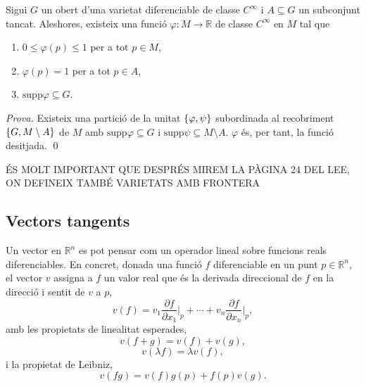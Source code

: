 \begin{corol}
    Sigui $G$ un obert d'una varietat diferenciable de classe $C^\infty$ i $A\subseteq G$ un subconjunt tancat. Aleshores, existeix una funció $\varphi:M\to\mathbb R$ de classe $C^\infty$ en $M$ tal que
    \begin{enumerate}
        \item $0\leq\varphi(p)\leq 1$ per a tot $p\in M$,
        \item $\varphi(p) = 1$ per a tot $p\in A$,
        \item $\text{supp}\varphi\subseteq G$.
    \end{enumerate}
\end{corol}
{
\color{green!50!black} \textit{Prova.} 
Existeix una partició de la unitat $\{\varphi, \psi\}$ subordinada al recobriment $\{G, M\setminus A\}$ de $M$ amb $\text{supp}\varphi\subseteq G$ i $\text{supp}\psi\subseteq M\setminus A$. $\varphi$ és, per tant, la funció desitjada. \qed
}

{\color{red} ÉS MOLT IMPORTANT QUE DESPRÉS MIREM LA PÀGINA 24 DEL LEE, ON DEFINEIX TAMBÉ VARIETATS AMB FRONTERA}

\subsection{Vectors tangents}
Un vector en $\mathbb R^n$ es pot pensar com un operador lineal sobre funcions reals diferenciables. En concret, donada una funció $f$ diferenciable en un punt $p\in\mathbb R^n$, el vector $v$ assigna a $f$ un valor real que és la derivada direccional de $f$ en la direcció i sentit de $v$ a $p$,
\begin{equation*}
    v(f) = v_1\frac{\partial f}{\partial x_1}\Big|_p + \cdots + v_n\frac{\partial f}{\partial x_n}\Big|_p,
\end{equation*}
amb les propietats de linealitat esperades,
\begin{equation*}
    v(f+g) = v(f) + v(g),
\end{equation*}
\begin{equation*}
    v(\lambda f) = \lambda v(f),
\end{equation*}
i la propietat de Leibniz,
\begin{equation*}
    v(fg) = v(f)g(p) + f(p)v(g).
\end{equation*}

